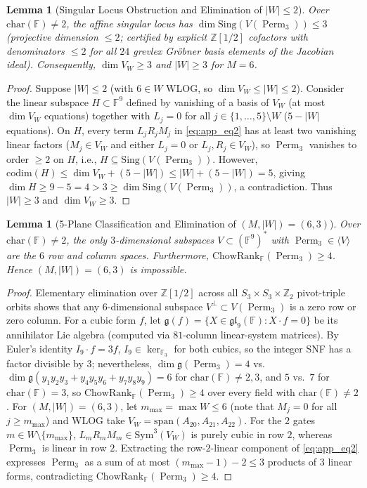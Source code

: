 \documentclass[11pt,a4paper]{article}
\newtheorem{lemma}[theorem]{Lemma}
\newcommand{\Perm}{\operatorname{Perm}}
\newcommand{\F}{\mathbb{F}}
\begin{document}
\begin{lemma}[Singular Locus Obstruction and Elimination of $|W| \le 2$]
{\sloppy Over $\mathrm{char}(\F) \neq 2$, the affine singular locus has $\dim \mathrm{Sing}(V(\Perm_3)) \le 3$ (projective dimension $\le 2$; certified by explicit $\mathbb{Z}[1/2]$ cofactors with denominators $\le 2$ for all $24$ grevlex Gr\"obner basis elements of the Jacobian ideal). Consequently, $\dim V_W \ge 3$ and $|W| \ge 3$ for $M = 6$.\par}
\end{lemma}
\begin{proof}
Suppose $|W| \le 2$ (with $6 \in W$ WLOG, so $\dim V_W \le |W| \le 2$). Consider the linear subspace $H \subset \F^9$ defined by vanishing of a basis of $V_W$ (at most $\dim V_W$ equations) together with $L_j = 0$ for all $j \in \{1,\dots,5\} \setminus W$ ($5 - |W|$ equations). On $H$, every term $L_j R_j M_j$ in \eqref{eq:app_eq2} has at least two vanishing linear factors ($M_j \in V_W$ and either $L_j = 0$ or $L_j, R_j \in V_W$), so $\Perm_3$ vanishes to order $\ge 2$ on $H$, i.e., $H \subseteq \mathrm{Sing}(V(\Perm_3))$. However, $\mathrm{codim}(H) \le \dim V_W + (5 - |W|) \le |W| + (5 - |W|) = 5$, giving $\dim H \ge 9 - 5 = 4 > 3 \ge \dim \mathrm{Sing}(V(\Perm_3))$, a contradiction. Thus $|W| \ge 3$ and $\dim V_W \ge 3$.
\end{proof}

\begin{lemma}[5-Plane Classification and Elimination of $(M, |W|) = (6, 3)$]
Over $\mathrm{char}(\F) \neq 2$, the only $3$-dimensional subspaces $V \subset (\F^9)^*$ with $\Perm_3 \in \langle V \rangle$ are the $6$ row and column spaces. Furthermore, $\mathrm{ChowRank}_{\F}(\Perm_3) \ge 4$. Hence $(M, |W|) = (6, 3)$ is impossible.
\end{lemma}
\begin{proof}
Elementary elimination over $\mathbb{Z}[1/2]$ across all $S_3 \times S_3 \times \mathbb{Z}_2$ pivot-triple orbits shows that any $6$-dimensional subspace $V^\perp \subset V(\Perm_3)$ is a zero row or zero column. For a cubic form $f$, let $\mathfrak{g}(f) = \{X \in \mathfrak{gl}_9(\F) : X \cdot f = 0\}$ be its annihilator Lie algebra (computed via $81$-column linear-system matrices). By Euler's identity $I_9 \cdot f = 3f$, $I_9 \in \ker_{\F_3}$ for both cubics, so the integer SNF has a factor divisible by $3$; nevertheless, $\dim \mathfrak{g}(\Perm_3) = 4$ vs.\ $\dim \mathfrak{g}(y_1 y_2 y_3 + y_4 y_5 y_6 + y_7 y_8 y_9) = 6$ for $\mathrm{char}(\F) \neq 2,3$, and $5$ vs.\ $7$ for $\mathrm{char}(\F) = 3$, so $\mathrm{ChowRank}_{\F}(\Perm_3) \ge 4$ over every field with $\mathrm{char}(\F) \neq 2$. For $(M, |W|) = (6, 3)$, let $m_{\max} = \max W \le 6$ (note that $M_j = 0$ for all $j \ge m_{\max}$) and WLOG take $V_W = \mathrm{span}(A_{20}, A_{21}, A_{22})$. For the $2$ gates $m \in W \setminus \{m_{\max}\}$, $L_m R_m M_m \in \mathrm{Sym}^3(V_W)$ is purely cubic in row $2$, whereas $\Perm_3$ is linear in row $2$. Extracting the row-$2$-linear component of \eqref{eq:app_eq2} expresses $\Perm_3$ as a sum of at most $(m_{\max} - 1) - 2 \le 3$ products of $3$ linear forms, contradicting $\mathrm{ChowRank}_{\F}(\Perm_3) \ge 4$.
\end{proof}
\end{document}
